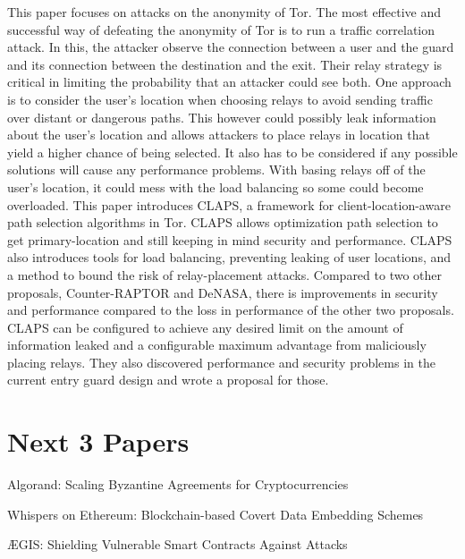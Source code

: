 \documentclass{article}
\begin{document}
This paper focuses on attacks on the anonymity of Tor. The most effective and successful way of defeating the anonymity of Tor is to run a traffic correlation attack. In this, the attacker observe the connection between a user and the guard and its connection between the destination and the exit. Their relay strategy is critical in limiting the probability that an attacker could see both. One approach is to consider the user's location when choosing relays to avoid sending traffic over distant or dangerous paths. This however could possibly leak information about the user's location and allows attackers to place relays in location that yield a higher chance of being selected. It also has to be considered if any possible solutions will cause any performance problems. With basing relays off of the user's location, it could mess with the load balancing so some could become overloaded. This paper introduces CLAPS, a framework for client-location-aware path selection algorithms in Tor. CLAPS allows optimization path selection to get primary-location and still keeping in mind security and performance. CLAPS also introduces tools for load balancing, preventing leaking of user locations, and a method to bound the risk of relay-placement attacks. Compared to two other proposals, Counter-RAPTOR and DeNASA, there is improvements in security and performance compared to the loss in performance of the other two proposals. CLAPS can be configured to achieve any desired limit on the amount of information leaked and a configurable maximum advantage from maliciously placing relays. They also discovered performance and security problems in the current entry guard design and wrote a proposal for those.

\section{Next 3 Papers}
\item Algorand: Scaling Byzantine Agreements for Cryptocurrencies
\item Whispers on Ethereum: Blockchain-based Covert Data Embedding Schemes
\item ÆGIS: Shielding Vulnerable Smart Contracts Against Attacks
\printbibliography
\end{document}

